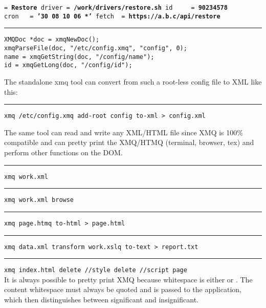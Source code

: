 \documentclass[10pt,a4paper]{article}
\newcommand{\xmqEK}[1]{{\color{xmqEK}#1}}
\newcommand{\xmqEKV}[1]{{\color{xmqEKV}\textbf{#1}}}
\newcommand{\xmqI}[0]{{\mbox{\ }}}
\begin{document}
\begin{minipage}[b][23mm][b]{63mm}
\texttt{\flushleft\noindent \xmqEK{name}\xmqI \xmqI \xmqI =\xmqI \xmqEKV{Restore}\linebreak
\xmqEK{driver}\xmqI =\xmqI \xmqEKV{/work/drivers/restore.sh}\linebreak
\xmqEK{id}\xmqI \xmqI \xmqI \xmqI \xmqI =\xmqI \xmqEKV{90234578}\linebreak
\xmqEK{cron}\xmqI \xmqI \xmqI =\xmqI \xmqEKV{'}\xmqEKV{30 08 10 06 *}\xmqEKV{'}\linebreak
\xmqEK{fetch}\xmqI \xmqI =\xmqI \xmqEKV{https://a.b.c/api/restore}
}
\end{minipage}
\rule{5mm}{0cm}
\begin{minipage}[b][23mm][t]{63mm}
\verb|XMQDoc *doc = xmqNewDoc();|\\
\verb|xmqParseFile(doc, "/etc/config.xmq", "config", 0);|\\
\verb|name = xmqGetString(doc, "/config/name");|\\
\verb|id = xmqGetLong(doc, "/config/id");|\\
\end{minipage}

\vspace{-5mm}
The standalone xmq tool can convert from such a root-less config file to XML like this:

\rule{2cm}{0cm}\texttt{xmq /etc/config.xmq add-root config to-xml > config.xml}

The same tool can read and write any XML/HTML file since XMQ is 100\% compatible and can
pretty print the XMQ/HTMQ (terminal, browser, tex) and perform other functions on the DOM.

\rule{2cm}{0cm}\texttt{xmq work.xml}\\
\rule{2cm}{0cm}\texttt{xmq work.xml browse} \\
\rule{2cm}{0cm}\texttt{xmq page.htmq to-html > page.html} \\
\rule{2cm}{0cm}\texttt{xmq data.xml transform work.xslq to-text > report.txt} \\
\rule{2cm}{0cm}\texttt{xmq index.html delete //style delete //script page} \\

\vspace{-4mm}
{\flushleft{\large\textsc{\color{Red}{Whitespace}}}} It is always possible to pretty print XMQ because
whitespace is either \textit{\color{Blue}{separating}} or \textit{\color{Blue}{content}}.
The content whitespace must always be quoted and is passed to the application, which then
distinguishes between significant and insignificant.
\end{document}

